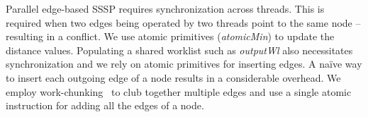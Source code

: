 Parallel edge-based SSSP requires synchronization across threads.
This is required when two edges being operated by two threads point to the same node -- resulting in a conflict.
We use atomic primitives (\textit{atomicMin}) to update the distance values.
Populating a shared worklist such as \textit{outputWl} also necessitates synchronization and we rely on atomic primitives for inserting edges.
A na\"ive way to insert each outgoing edge of a node results in a considerable overhead.
We employ work-chunking~\cite{nasre-datavstoplogy-ipdps2013} to club together multiple edges and use a single atomic instruction for adding all the edges of a node.

